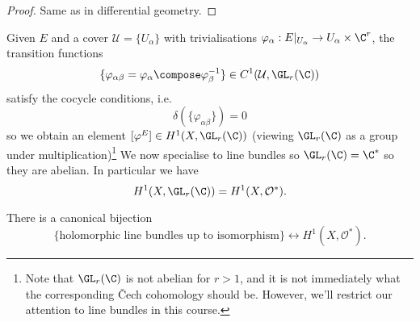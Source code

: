 \documentclass[a4paper]{article}
\begin{document}
\begin{proof}
  Same as in differential geometry.
\end{proof}

Given \(E\) and a cover \(\mathcal U = \{U_\alpha\}\) with trivialisations \(\varphi_\alpha: E|_{U_\alpha} \to U_\alpha \times \C^r\), the transition functions
\[
  \{\varphi_{\alpha\beta} = \varphi_\alpha \compose \varphi_\beta^{-1}\} \in C^1(\mathcal U, \GL_r(\C))
\]
satisfy the cocycle conditions, i.e.
\[
  \delta(\{\varphi_{\alpha\beta}\}) = 0
\]
so we obtain an element \([\varphi^E] \in H^1(X, \GL_r(\C))\) (viewing \(\GL_r(\C)\) as a group under multiplication)\footnote{Note that \(\GL_r(\C)\) is not abelian for \(r > 1\), and it is not immediately what the corresponding Čech cohomology should be. However, we'll restrict our attention to line bundles in this course.} We now specialise to line bundles so \(\GL_r(\C) = \C^*\) so they are abelian. In particular we have
\[
  H^1(X, \GL_r(\C)) = H^1(X, \mathcal O^*).
\]

\begin{proposition}
  There is a canonical bijection
  \[
    \{\text{holomorphic line bundles up to isomorphism}\} \leftrightarrow H^1(X, \mathcal O^*).
  \]
\end{proposition}
\end{document}
